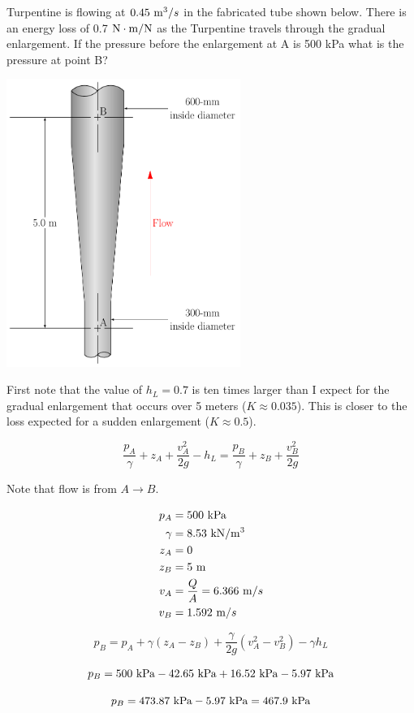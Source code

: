 \documentclass[multi,preview,varwidth=false,border=5,12pt]{standalone}
\begin{document}
\begin{question}

Turpentine is flowing at $0.45~\mathrm{m}^3/s$ in the fabricated tube shown below.  There is an energy loss of 0.7 $\mathrm{N}\cdot \mathrm{m}/\mathrm{N}$ as the Turpentine travels through the gradual enlargement.  If the pressure before the enlargement at A is 500 kPa what is the pressure at point B?

\includegraphics[width=3in]{imgs/PipeExp1.pdf}

\begin{solution}

First note that the value of $h_L=0.7$ is ten times larger than I expect for the gradual enlargement that occurs over 5 meters ($K\approx 0.035$).  This is closer to the loss expected for a sudden enlargement ($K\approx 0.5$).

$$
\frac{p_A}{\gamma}+z_A+\frac{v_A^2}{2g}-h_L=\frac{p_B}{\gamma}+z_B+\frac{v_B^2}{2g}
$$

Note that flow is from $A \to B$.


\begin{align*}
p_A &= 500~\mathrm{kPa} \\
\gamma &=8.53~\mathrm{kN}/\mathrm{m}^3 \\
z_A &=0 \\
z_B &= 5~\mathrm{m} \\
v_A &=\frac{Q}{A}=6.366~\mathrm{m}/s \\
v_B &=1.592~\mathrm{m}/s
\end{align*}

$$
p_B=p_A+\gamma\left(z_A-z_B\right)+\frac{\gamma}{2g}\left(v_A^2-v_B^2\right)-\gamma h_L
$$

$$
p_B=500~\mathrm{kPa}-42.65~\mathrm{kPa}+16.52~\mathrm{kPa}-5.97~\mathrm{kPa}
$$

$$
p_B=473.87~\mathrm{kPa}-5.97~\mathrm{kPa}=467.9~\mathrm{kPa}
$$

\end{solution}

\end{question}
\end{document}
